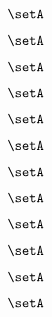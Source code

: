 {\begin{forslides}
        \begin{equation}
            \label{eq:slides-translation-131}
            \setA
        \end{equation}

        \begin{equation}
            \label{eq:slides-translation-132}
            \setA
        \end{equation}

        \begin{equation}
            \label{eq:slides-translation-133}
            \setA
        \end{equation}

        \begin{equation}
            \label{eq:slides-translation-134}
            \setA
        \end{equation}

        \begin{equation}
            \label{eq:slides-translation-135}
            \setA
        \end{equation}

        \begin{equation}
            \label{eq:slides-translation-136}
            \setA
        \end{equation}

        \begin{equation}
            \label{eq:slides-translation-137}
            \setA
        \end{equation}

        \begin{equation}
            \label{eq:slides-translation-138}
            \setA
        \end{equation}

        \begin{equation}
            \label{eq:slides-translation-139}
            \setA
        \end{equation}

        \begin{equation}
            \label{eq:slides-translation-140}
            \setA
        \end{equation}

        \begin{equation}
            \label{eq:slides-translation-141}
            \setA
        \end{equation}

        \begin{equation}
            \label{eq:slides-translation-142}
            \setA
        \end{equation}


\end{forslides}}

